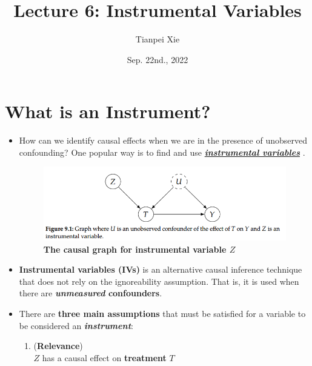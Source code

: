 \documentclass[11pt]{article}
\begin{document}
\title{Lecture 6: Instrumental Variables}
\author{ Tianpei Xie}
\date{Sep. 22nd., 2022 }
\maketitle
\tableofcontents
\newpage
\allowdisplaybreaks
\section{What is an Instrument?}
\begin{itemize}
\item How can we identify causal effects when we are in the presence of unobserved confounding? One popular way is to find and use \underline{\emph{\textbf{instrumental
variables}}} \citep{imbens2015causal, peters2017elements, neal2020introduction}. 

\begin{figure}
\begin{minipage}[t]{1\linewidth}
  \centering
  \centerline{\includegraphics[scale = 0.5]{instrumental_var.png}}
\end{minipage}
\caption{\footnotesize{\textbf{The causal graph for instrumental variable $Z$ \citep{neal2020introduction}}}}
\label{fig: instrumental_var}
\end{figure}

\item \textbf{Instrumental variables (IVs)} is an alternative causal inference technique that does not rely on the ignoreability assumption. That is, it is used when there are \textbf{\emph{unmeasured} confounders}.

\item There are \textbf{three main assumptions} that must be satisfied for a variable to be considered an \emph{\textbf{instrument}}:
\begin{enumerate}
\item \begin{assumption} (\textbf{Relevance})\\
 $Z$ has a causal effect on \textbf{treatment} $T$
\end{assumption}


\end{enumerate}
\end{itemize}
\end{document}

